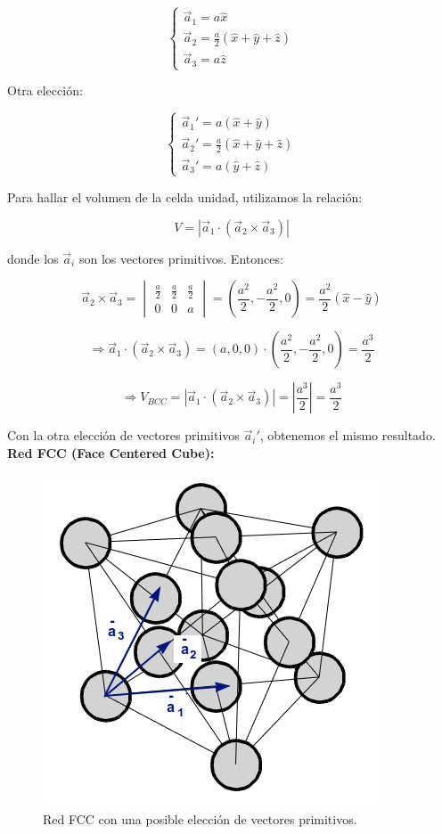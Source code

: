 \documentclass[a4paper]{article}
\begin{document}
$$\begin{cases}
\vec{a}_{1} = a\hat{x} \\
\vec{a}_{2} = \frac{a}{2}(\hat{x} + \hat{y} + \hat{z}) \\
\vec{a}_{3} = a\hat{z}
\end{cases}$$

Otra elecci\'on:

$$\begin{cases}
\vec{a}_{1}' = a(\hat{x} + \hat{y}) \\
\vec{a}_{2}' = \frac{a}{2}(\hat{x} + \hat{y} + \hat{z}) \\
\vec{a}_{3}' = a(\hat{y} + \hat{z})
\end{cases}$$

Para hallar el volumen de la celda unidad, utilizamos la relaci\'on:

\begin{equation}
\label{eq:vol_celda_unidad}
V = | \vec{a}_{1} \cdot (\vec{a}_{2} \times \vec{a}_{3})|
\end{equation}

donde los $\vec{a}_{i}$ son los vectores primitivos. Entonces:

$$ \vec{a}_{2} \times \vec{a}_{3} = \begin{vmatrix}
\frac{a}{2} & \frac{a}{2} & \frac{a}{2} \\ 
0 & 0 & a
\end{vmatrix}  = (\frac{a^{2}}{2}, -\frac{a^{2}}{2}, 0) = \frac{a^{2}}{2}(\hat{x} - \hat{y})$$

$$ \Rightarrow \vec{a}_{1} \cdot (\vec{a}_{2} \times \vec{a}_{3}) = (a, 0, 0) \cdot (\frac{a^{2}}{2}, -\frac{a^{2}}{2}, 0) = \frac{a^{3}}{2}$$

$$ \Rightarrow V_{BCC} = | \vec{a}_{1} \cdot (\vec{a}_{2} \times \vec{a}_{3})| = |\frac{a^{3}}{2}| = \frac{a^{3}}{2}$$

Con la otra elecci\'on de vectores primitivos $\vec{a}_{i}'$, obtenemos el mismo resultado.\\

\textbf{Red FCC (Face Centered Cube):}

\begin{figure}[H]
  \centering
  \includegraphics[width=0.5\linewidth,height=0.5\linewidth]{fcc.png}
  \caption{Red FCC con una posible elecci\'on de vectores primitivos.}
  \label{fig:fcc}
\end{figure}
\end{document}
